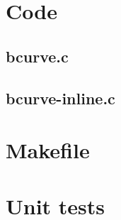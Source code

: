 \begin{scriptsize}
\begin{ttfamily}

\end{ttfamily}
\end{scriptsize}

\section{Code}

\subsection{bcurve.c}

\begin{scriptsize}
\begin{ttfamily}

\end{ttfamily}
\end{scriptsize}

\subsection{bcurve-inline.c}

\begin{scriptsize}
\begin{ttfamily}

\end{ttfamily}
\end{scriptsize}

\section{Makefile}

\begin{scriptsize}
\begin{ttfamily}

\end{ttfamily}
\end{scriptsize}

\section{Unit tests}

\begin{scriptsize}
\begin{ttfamily}

\end{ttfamily}
\end{scriptsize}


